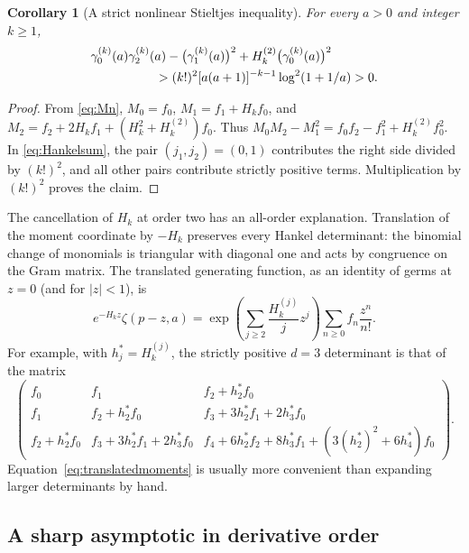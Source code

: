 \documentclass[11pt]{article}
\numberwithin{equation}{section}
\newtheorem{corollary}[theorem]{Corollary}
\theoremstyle{definition}\newtheorem{definition}[theorem]{Definition}
\theoremstyle{remark}\newtheorem{remark}[theorem]{Remark}
\begin{document}
\begin{corollary}[A strict nonlinear Stieltjes inequality]
\label{cor:StieltjesHankel}
For every $a>0$ and integer $k\ge1$,
\begin{align}\label{eq:Stieltjesineq}
 &\gamma_0^{(k)}(a)\gamma_2^{(k)}(a)
   -\bigl(\gamma_1^{(k)}(a)\bigr)^2
   +H_k^{(2)}\bigl(\gamma_0^{(k)}(a)\bigr)^2\notag\\
 &\hspace{18mm}>(k!)^2[a(a+1)]^{-k-1}\log^2(1+1/a)>0.
\end{align}
\end{corollary}
\begin{proof}
From \eqref{eq:Mn},
$M_0=f_0$, $M_1=f_1+H_kf_0$, and
$M_2=f_2+2H_kf_1+(H_k^2+H_k^{(2)})f_0$.
Thus $M_0M_2-M_1^2=f_0f_2-f_1^2+H_k^{(2)}f_0^2$.
In \eqref{eq:Hankelsum}, the pair $(j_1,j_2)=(0,1)$ contributes the
right side divided by $(k!)^2$, and all other pairs contribute
strictly positive terms. Multiplication by $(k!)^2$ proves the claim.
\end{proof}

The cancellation of $H_k$ at order two has an all-order explanation.
Translation of the moment coordinate by $-H_k$ preserves every Hankel
determinant: the binomial change of monomials is triangular with diagonal
one and acts by congruence on the Gram matrix. The translated generating
function, as an identity of germs at $z=0$ (and for $|z|<1$), is
\begin{equation}\label{eq:translatedmoments}
 e^{-H_kz}\zeta(p-z,a)
 =\exp\left(\sum_{j\ge2}\frac{H_k^{(j)}}j z^j\right)
                     \sum_{n\ge0}f_n\frac{z^n}{n!}.
\end{equation}
For example, with $h_j^*=H_k^{(j)}$, the strictly positive $d=3$
determinant is that of the matrix
\begin{equation}\label{eq:Hankel3}
 \begin{pmatrix}
 f_0&f_1&f_2+h_2^*f_0\\
 f_1&f_2+h_2^*f_0&f_3+3h_2^*f_1+2h_3^*f_0\\
 f_2+h_2^*f_0&f_3+3h_2^*f_1+2h_3^*f_0&
 f_4+6h_2^*f_2+8h_3^*f_1+(3(h_2^*)^2+6h_4^*)f_0
 \end{pmatrix}.
\end{equation}
Equation~\eqref{eq:translatedmoments} is usually more convenient than
expanding larger determinants by hand.

\subsection{A sharp asymptotic in derivative order}
\end{document}
